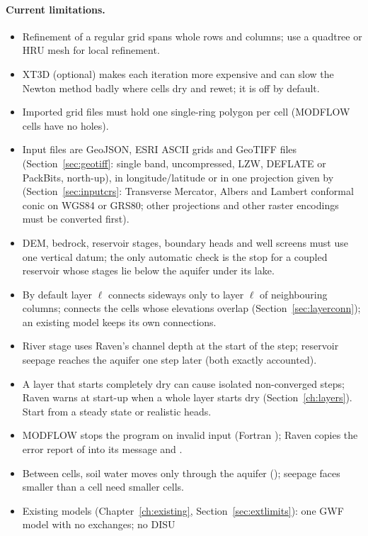 \paragraph{Current limitations.}
\begin{itemize}
\item Refinement of a regular grid spans whole rows and columns; use a quadtree or HRU mesh for local refinement.
\item XT3D (optional) makes each iteration more expensive and can slow the Newton method badly where cells dry and rewet; it is off by default.
\item Imported grid files must hold one single-ring polygon per cell (MODFLOW cells have no holes).
\item Input files are GeoJSON, ESRI ASCII grids and GeoTIFF files (Section~\ref{sec:geotiff}: single band, uncompressed,
LZW, DEFLATE or PackBits, north-up), in longitude/latitude or in one projection given by 
(Section~\ref{sec:inputcrs}: Transverse Mercator, Albers and Lambert conformal conic on WGS84 or GRS80; other projections
and other raster encodings must be converted first).
\item DEM, bedrock, reservoir stages, boundary heads and well screens must use one vertical datum; the only automatic check
is the stop for a coupled reservoir whose stages lie below the aquifer under its lake.
\item By default layer $\ell$ connects sideways only to layer $\ell$ of neighbouring columns; 
connects the cells whose elevations overlap (Section~\ref{sec:layerconn}); an existing model keeps its own connections.
\item River stage uses Raven's channel depth at the start of the step; reservoir seepage reaches the aquifer one step
later (both exactly accounted).
\item A layer that starts completely dry can cause isolated non-converged steps; Raven warns at start-up when a whole layer
starts dry (Section~\ref{ch:layers}). Start from a steady state or realistic heads.
\item MODFLOW stops the program on invalid input (Fortran ); Raven copies the error report of
 into its message and .
\item Between cells, soil water moves only through the aquifer (); seepage faces smaller than a cell
need smaller cells.
\item Existing models (Chapter~\ref{ch:existing}, Section~\ref{sec:extlimits}): one GWF model with no exchanges; no DISU

\end{itemize}
